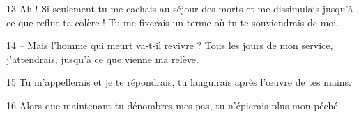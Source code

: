 13 Ah ! Si seulement tu me cachais au séjour des morts et me dissimulais jusqu’à ce que reflue ta colère ! Tu me fixerais un terme où tu te souviendrais de moi.

14 – Mais l’homme qui meurt va-t-il revivre ? Tous les jours de mon service, j’attendrais, jusqu’à ce que vienne ma relève.

15 Tu m’appellerais et je te répondrais, tu languirais après l’œuvre de tes mains.

16 Alors que maintenant tu dénombres mes pas, tu n’épierais plus mon péché.